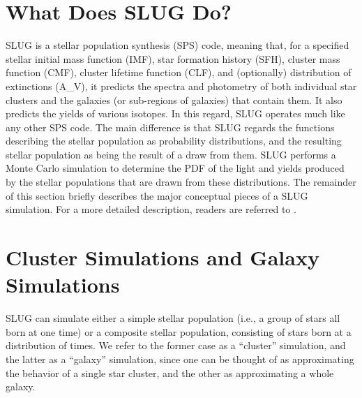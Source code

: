 \documentclass[letterpaper,10pt,english]{sphinxmanual}
\begin{document}
\section{What Does SLUG Do?}
\label{\detokenize{intro:what-does-slug-do}}
SLUG is a stellar population synthesis (SPS) code, meaning that, for a specified stellar initial mass function (IMF), star formation history (SFH), cluster mass function (CMF), cluster lifetime function (CLF), and (optionally) distribution of extinctions (A\_V), it predicts the spectra and photometry of both individual star clusters and the galaxies (or sub-regions of galaxies) that contain them. It also predicts the yields of various isotopes. In this regard, SLUG operates much like any other SPS code. The main difference is that SLUG regards the functions describing the stellar population as probability distributions, and the resulting stellar population as being the result of a draw from them. SLUG performs a Monte Carlo simulation to determine the PDF of the light and yields produced by the stellar populations that are drawn from these distributions. The remainder of this section briefly describes the major conceptual pieces of a SLUG simulation. For a more detailed description, readers are referred to .


\section{Cluster Simulations and Galaxy Simulations}
\label{\detokenize{intro:cluster-simulations-and-galaxy-simulations}}
SLUG can simulate either a simple stellar population (i.e., a group of stars all born at one time) or a composite stellar population, consisting of stars born at a distribution of times. We refer to the former case as a “cluster” simulation, and the latter as a “galaxy” simulation, since one can be thought of as approximating the behavior of a single star cluster, and the other as approximating a whole galaxy.
\end{document}
